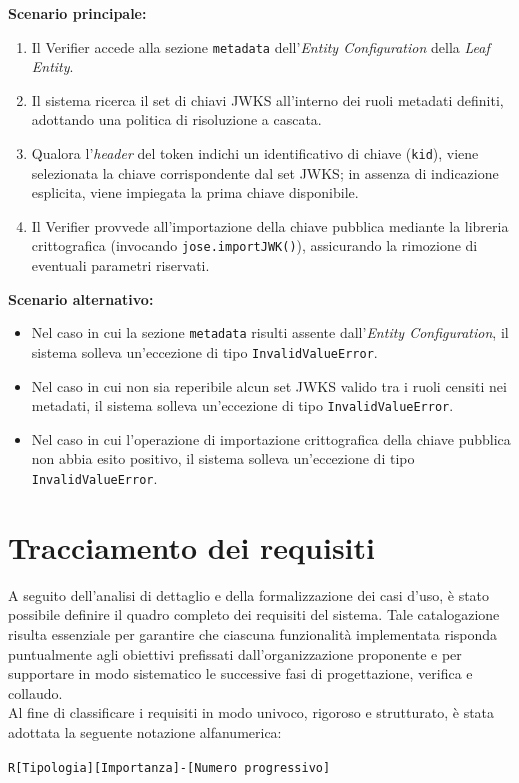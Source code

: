 \noindent\textbf{Scenario principale:}
\begin{enumerate}
    \item Il Verifier accede alla sezione \texttt{metadata} dell'\textit{Entity Configuration} della \textit{Leaf Entity}.
    \item Il sistema ricerca il set di chiavi JWKS all'interno dei ruoli metadati definiti, adottando una politica di risoluzione a cascata.
    \item Qualora l'\textit{header} del token indichi un identificativo di chiave (\texttt{kid}), viene selezionata la chiave corrispondente dal set JWKS; in assenza di indicazione esplicita, viene impiegata la prima chiave disponibile.
    \item Il Verifier provvede all'importazione della chiave pubblica mediante la libreria crittografica (invocando \texttt{jose.importJWK()}), assicurando la rimozione di eventuali parametri riservati.
\end{enumerate}

\noindent\textbf{Scenario alternativo:}
\begin{itemize}
    \item Nel caso in cui la sezione \texttt{metadata} risulti assente dall'\textit{Entity Configuration}, il sistema solleva un'eccezione di tipo \texttt{InvalidValueError}.
    \item Nel caso in cui non sia reperibile alcun set JWKS valido tra i ruoli censiti nei metadati, il sistema solleva un'eccezione di tipo \texttt{InvalidValueError}.
    \item Nel caso in cui l'operazione di importazione crittografica della chiave pubblica non abbia esito positivo, il sistema solleva un'eccezione di tipo \texttt{InvalidValueError}.
\end{itemize}

\section{Tracciamento dei requisiti}
A seguito dell'analisi di dettaglio e della formalizzazione dei casi d'uso, è stato possibile definire il quadro completo dei requisiti del sistema. Tale catalogazione risulta essenziale per garantire che ciascuna funzionalità implementata risponda puntualmente agli obiettivi prefissati dall'organizzazione proponente e per supportare in modo sistematico le successive fasi di progettazione, verifica e collaudo.
\\
Al fine di classificare i requisiti in modo univoco, rigoroso e strutturato, è stata adottata la seguente notazione alfanumerica:
\begin{center}
    \texttt{R[Tipologia][Importanza]-\allowbreak{}[Numero progressivo]}
\end{center}

